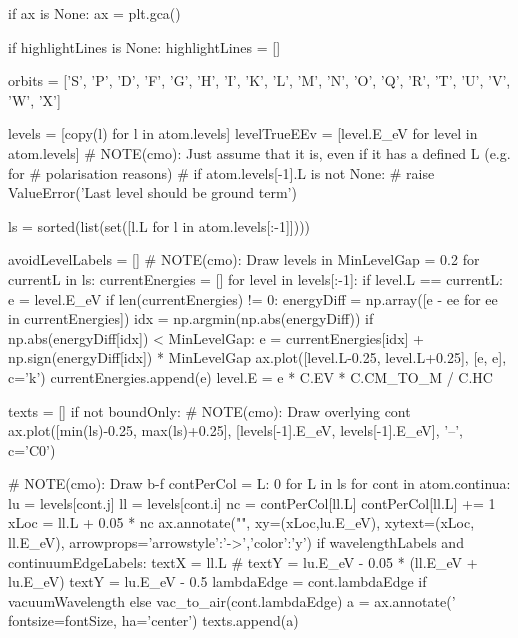 \begin{pycode}[FlareObs]
    if ax is None:
        ax = plt.gca()

    if highlightLines is None:
        highlightLines = []

    orbits = ['S', 'P', 'D', 'F', 'G', 'H', 'I', 'K', 'L', 'M', 'N', 'O', 'Q', 'R', 'T', 'U', 'V', 'W', 'X']

    levels = [copy(l) for l in atom.levels]
    levelTrueEEv = [level.E_eV for level in atom.levels]
    # NOTE(cmo): Just assume that it is, even if it has a defined L (e.g. for
    # polarisation reasons)
    # if atom.levels[-1].L is not None:
    #     raise ValueError('Last level should be ground term')

    ls = sorted(list(set([l.L for l in atom.levels[:-1]])))

    avoidLevelLabels = []
    # NOTE(cmo): Draw levels in
    MinLevelGap = 0.2
    for currentL in ls:
        currentEnergies = []
        for level in levels[:-1]:
            if level.L == currentL:
                e = level.E_eV
                if len(currentEnergies) != 0:
                    energyDiff = np.array([e - ee for ee in currentEnergies])
                    idx = np.argmin(np.abs(energyDiff))
                    if np.abs(energyDiff[idx]) < MinLevelGap:
                        e = currentEnergies[idx] + np.sign(energyDiff[idx]) * MinLevelGap
                ax.plot([level.L-0.25, level.L+0.25], [e, e], c='k')
                currentEnergies.append(e)
                level.E = e * C.EV * C.CM_TO_M / C.HC


    texts = []
    if not boundOnly:
        # NOTE(cmo): Draw overlying cont
        ax.plot([min(ls)-0.25, max(ls)+0.25], [levels[-1].E_eV, levels[-1].E_eV], '--', c='C0')

        # NOTE(cmo): Draw b-f
        contPerCol = {L: 0 for L in ls}
        for cont in atom.continua:
            lu = levels[cont.j]
            ll = levels[cont.i]
            nc = contPerCol[ll.L]
            contPerCol[ll.L] += 1
            xLoc = ll.L + 0.05 * nc
            ax.annotate("", xy=(xLoc,lu.E_eV), xytext=(xLoc, ll.E_eV), arrowprops={'arrowstyle':'->','color':'y'})
            if wavelengthLabels and continuumEdgeLabels:
                textX = ll.L
                # textY = lu.E_eV - 0.05 * (ll.E_eV + lu.E_eV)
                textY = lu.E_eV - 0.5
                lambdaEdge = cont.lambdaEdge if vacuumWavelength else vac_to_air(cont.lambdaEdge)
                a = ax.annotate('%
                                fontsize=fontSize, ha='center')
                texts.append(a)



\end{pycode}
